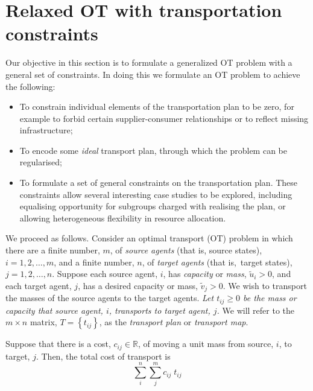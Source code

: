\documentclass[twocolumn]{article}
\begin{document}
\section{Relaxed OT with transportation constraints}
\label{sec:OTzero}
Our objective in this section is to formulate a generalized  OT problem with a general set of constraints. In doing this we formulate an OT problem to achieve the following:
\begin{itemize}
\item[1] To constrain individual elements of the transportation plan to be zero, for example to forbid certain supplier-consumer relationships or to reflect missing infrastructure;%

\item[2] To encode some \textit{ideal} transport plan, through which the problem can be regularised;%

\item[3] To formulate a set of general constraints on the transportation plan. These constraints allow several interesting case studies to be explored, including equalising opportunity for subgroups charged with realising the plan, or allowing heterogeneous flexibility in resource allocation.%

\end{itemize}

We proceed as follows. Consider an optimal transport (OT) problem in which there are a finite number, $m$, of {\em source agents}  (that is, source states), $i=1,2, \dots, m$,  and a finite number, $n$, of {\em target agents} (that is,\ target states),  $j= 1,2, \dots, n$.
Suppose each source agent, $i$, has {\em capacity} or {\em mass},  $\tilde{u}_i  >0$,  and each target agent, $j$, has a desired capacity or mass, $\tilde{v} _j >0$.
We wish to transport the masses of the source agents to the target agents.
 {\em Let
$
t_{ij} \ge 0
$
be the mass or capacity that source agent, $i$,  transports to  target agent, $j$.}
We will refer to  the $m \times n$ matrix, $T=\left\{t_{ij}\right\}$, as the {\em transport plan} or {\em transport map}.

Suppose that  there is a cost, $c_{ij} \in \mathbb{R}$, of moving a unit mass from source, $i$, to
target,  $j$.
Then, the total cost of transport is
\begin{equation}
\label{eq:cost0}
\sum_i^n \sum_{j}^m c_{ij} \; t_{ij} 
\end{equation}
\end{document}
